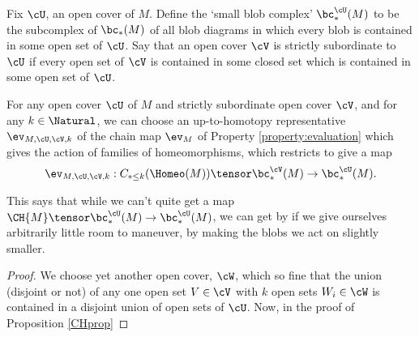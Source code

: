
Fix $\cU$, an open cover of $M$. Define the `small blob complex' $\bc^{\cU}_*(M)$ to be the subcomplex of $\bc_*(M)$ of all blob diagrams in which every blob is contained in some open set of $\cU$. Say that an open cover $\cV$ is strictly subordinate to $\cU$ if every open set of $\cV$ is contained in some closed set which is contained in some open set of $\cU$.

\begin{lem}
\label{lem:CH-small-blobs}
For any open cover $\cU$ of $M$ and strictly subordinate open cover $\cV$, and for any $k \in \Natural$, we can choose an up-to-homotopy representative $\ev_{M,\cU,\cV,k}$ of the chain map $\ev_M$ of Property \ref{property:evaluation} which gives the action of families of homeomorphisms, which restricts to give a map $$\ev_{M,\cU,\cV,k} : C_{*\leq k}(\Homeo(M)) \tensor \bc^{\cV}_*(M) \to \bc^{\cU}_*(M).$$
\end{lem}
\begin{rem}
This says that while we can't quite get a map $\CH{M} \tensor \bc^{\cU}_*(M) \to \bc^{\cU}_*(M)$, we can get by if we give ourselves arbitrarily little room to maneuver, by making the blobs we act on slightly smaller.
\end{rem}
\begin{proof}
We choose yet another open cover, $\cW$, which so fine that the union (disjoint or not) of any one open set $V \in \cV$ with $k$ open sets $W_i \in \cW$ is contained in a disjoint union of open sets of $\cU$.
Now, in the proof of Proposition \ref{CHprop}
\end{proof}

